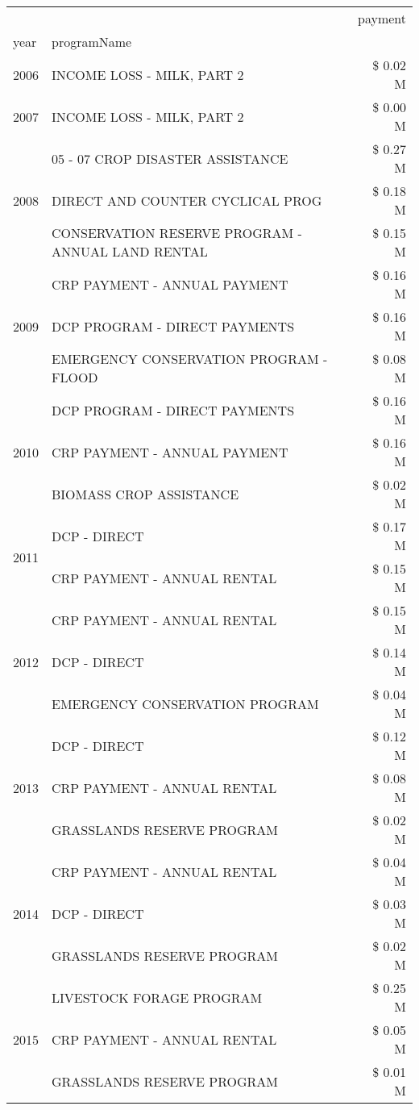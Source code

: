 \begin{tabular}{llr}
\toprule
 &  & payment \\
year & programName &  \\
\midrule
2006 & INCOME LOSS - MILK, PART 2 & \$ 0.02 M \\
\cline{1-3}
2007 & INCOME LOSS - MILK, PART 2 & \$ 0.00 M \\
\cline{1-3}
\multirow[t]{3}{*}{2008} & 05 - 07 CROP DISASTER ASSISTANCE & \$ 0.27 M \\
 & DIRECT AND COUNTER CYCLICAL PROG & \$ 0.18 M \\
 & CONSERVATION RESERVE PROGRAM - ANNUAL LAND RENTAL & \$ 0.15 M \\
\cline{1-3}
\multirow[t]{3}{*}{2009} & CRP PAYMENT - ANNUAL PAYMENT & \$ 0.16 M \\
 & DCP PROGRAM - DIRECT PAYMENTS & \$ 0.16 M \\
 & EMERGENCY CONSERVATION PROGRAM - FLOOD & \$ 0.08 M \\
\cline{1-3}
\multirow[t]{3}{*}{2010} & DCP PROGRAM - DIRECT PAYMENTS & \$ 0.16 M \\
 & CRP PAYMENT - ANNUAL PAYMENT & \$ 0.16 M \\
 & BIOMASS CROP ASSISTANCE & \$ 0.02 M \\
\cline{1-3}
\multirow[t]{2}{*}{2011} & DCP - DIRECT & \$ 0.17 M \\
 & CRP PAYMENT - ANNUAL RENTAL & \$ 0.15 M \\
\cline{1-3}
\multirow[t]{3}{*}{2012} & CRP PAYMENT - ANNUAL RENTAL & \$ 0.15 M \\
 & DCP - DIRECT & \$ 0.14 M \\
 & EMERGENCY CONSERVATION PROGRAM & \$ 0.04 M \\
\cline{1-3}
\multirow[t]{3}{*}{2013} & DCP - DIRECT & \$ 0.12 M \\
 & CRP PAYMENT - ANNUAL RENTAL & \$ 0.08 M \\
 & GRASSLANDS RESERVE PROGRAM & \$ 0.02 M \\
\cline{1-3}
\multirow[t]{3}{*}{2014} & CRP PAYMENT - ANNUAL RENTAL & \$ 0.04 M \\
 & DCP - DIRECT & \$ 0.03 M \\
 & GRASSLANDS RESERVE PROGRAM & \$ 0.02 M \\
\cline{1-3}
\multirow[t]{3}{*}{2015} & LIVESTOCK FORAGE PROGRAM & \$ 0.25 M \\
 & CRP PAYMENT - ANNUAL RENTAL & \$ 0.05 M \\
 & GRASSLANDS RESERVE PROGRAM & \$ 0.01 M \\

\end{tabular}
